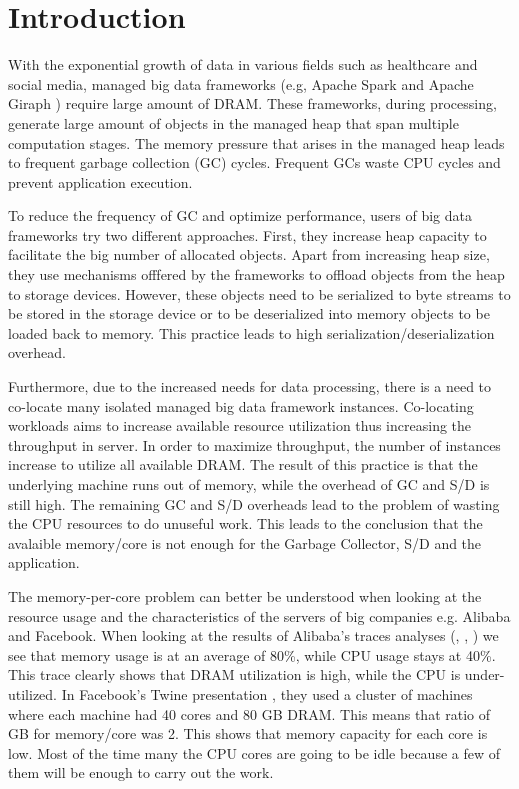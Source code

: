\section{Introduction}
\label{sec:intro}

With the exponential growth of data in various fields such as
healthcare and social media, managed big data frameworks (e.g, Apache
Spark \cite{Spark} and Apache Giraph \cite{Giraph}) require large
amount of DRAM. These frameworks, during processing, generate large
amount of objects in the managed heap that span multiple computation
stages. The memory pressure that arises in the managed heap leads to
frequent garbage collection (GC) cycles. Frequent GCs waste CPU cycles 
and prevent application execution.

To reduce the frequency of GC and optimize performance, users of big data
frameworks try two different approaches. First, they increase heap capacity to
facilitate the big number of allocated objects. Apart from increasing
heap size, they use mechanisms offfered by the frameworks 
to offload objects from the heap to storage devices. However, these
objects need to be serialized to byte streams to be stored in the storage
device or to be deserialized into memory objects to be loaded back to memory. 
This practice leads to high serialization/deserialization overhead.

Furthermore, due to the increased needs for data processing, there is
a need to co-locate many isolated managed big data framework
instances. Co-locating workloads aims to increase available resource utilization
thus increasing the throughput in server. 
In order to maximize throughput, the number of instances
increase to utilize all available DRAM. The result of this
practice is that the underlying machine runs out of memory, while the
 overhead of GC and S/D is still high. The remaining GC and S/D
overheads lead to the problem of wasting the CPU resources
to do unuseful work. This leads to the conclusion that the avalaible memory/core is
not enough for the Garbage Collector, S/D and the application.

The memory-per-core problem can better be understood when looking at
the resource usage and the characteristics of the servers of big
companies e.g. Alibaba and Facebook. When looking at the results of
Alibaba's traces analyses (\cite{Alibaba}, \cite{Alibaba1},
\cite{Alibabacolocated}) we see that memory usage is at an average of
80\%, while CPU usage stays at 40\%. This trace clearly shows that
DRAM utilization is high, while the CPU is under-utilized. In
Facebook's Twine presentation \cite{Twine}, they used a cluster of
machines where each machine had 40 cores and 80 GB DRAM. This means
that ratio of GB for memory/core was 2. This shows that memory
capacity for each core is low. Most of the time many the CPU cores are
going to be idle because a few of them will be enough to carry out the
work.

